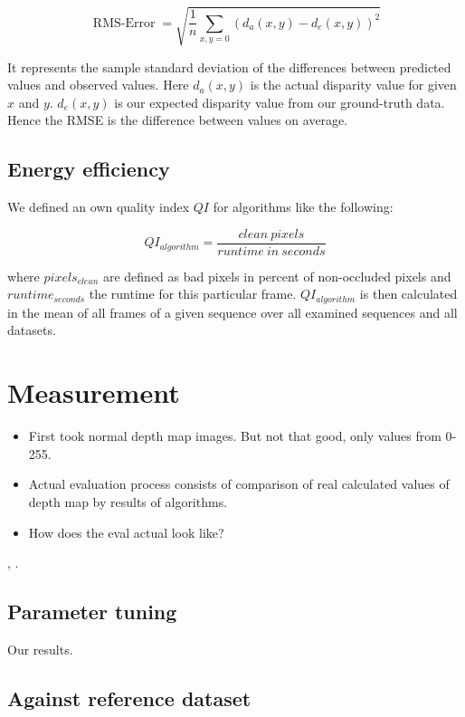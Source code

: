 \begin{equation}
  \operatorname{RMS-Error}=\sqrt{\frac{1}{n} \sum_{x,y=0}^{}(d_a(x,y) - d_e(x,y))^2}
\end{equation}

\noindent It represents the sample standard deviation of the differences between predicted values and observed values.
Here $d_a(x,y)$ is the actual disparity value for given $x$ and $y$.
$d_e(x,y)$ is our expected disparity value from our ground-truth data.
Hence the RMSE is the difference between values on average.

\subsection*{Energy efficiency}

We defined an own quality index $QI$ for algorithms like the following:

\begin{equation}
  QI_{algorithm} = \frac{clean\ pixels}{runtime\ in\ seconds}
\end{equation}

\noindent where $pixels_{clean}$ are defined as bad pixels in percent of non-occluded pixels and $runtime_{seconds}$ the runtime for this particular frame. $QI_{algorithm}$ is then calculated in the mean of all frames of a given sequence over all examined sequences and all datasets.

\section{Measurement}

\begin{itemize}
	\item First took normal depth map images. But not that good, only values from 0-255.
	\item Actual evaluation process consists of comparison of real calculated values of depth map by results of algorithms.
	\item How does the eval actual look like?
\end{itemize} \citep{benoit2008quality}, \citep{scharstein2002taxonomy}.

\subsection*{Parameter tuning}

Our results.

\subsection*{Against reference dataset}

